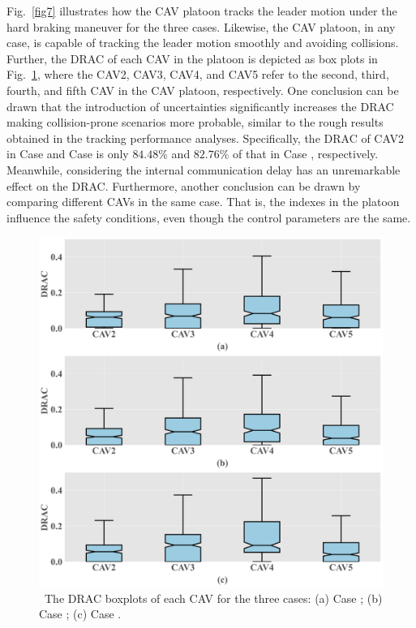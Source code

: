\documentclass[a4paper]{cas-sc}
\begin{document}
Fig.~\ref{fig7} illustrates how the CAV platoon tracks the leader motion under the hard braking maneuver for the three cases. Likewise, the CAV platoon, in any case, is capable of tracking the leader motion smoothly and avoiding collisions. Further, the DRAC of each CAV in the platoon is depicted as box plots in Fig.~\ref{fig8}, where the CAV2, CAV3, CAV4, and CAV5 refer to the second, third, fourth, and fifth CAV in the CAV platoon, respectively. One conclusion can be drawn that the introduction of uncertainties significantly increases the DRAC making collision-prone scenarios more probable, similar to the rough results obtained in the tracking performance analyses. Specifically, the DRAC of CAV2 in Case \uppercase\expandafter{} and Case \uppercase\expandafter{} is only $84.48\%$ and $82.76\%$ of that in Case \uppercase\expandafter{}, respectively. Meanwhile, considering the internal communication delay has an unremarkable effect on the DRAC. Furthermore, another conclusion can be drawn by comparing different CAVs in the same case. That is, the indexes in the platoon influence the safety conditions, even though the control parameters are the same.

\begin{figure}
  \centering
  \includegraphics[width=14cm]{figs/fig8.png}
  \caption{~The DRAC boxplots of each CAV for the three cases: (a) Case \uppercase\expandafter{}; (b) Case \uppercase\expandafter{}; (c) Case \uppercase\expandafter{}.}
  \label{fig8}
\end{figure}
\end{document}
